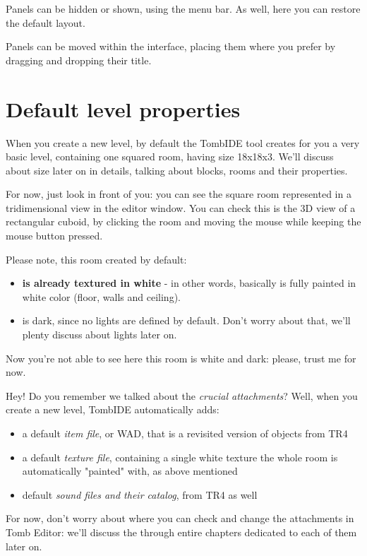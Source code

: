 Panels can be hidden or shown, using the  menu bar. As well, here you can restore the default layout.
\par Panels can be moved within the interface, placing them where you prefer by dragging and dropping their title.

\section{Default level properties}
When you create a new level, by default the TombIDE tool creates for you a very basic level, containing one squared room, having size 18x18x3.
We'll discuss about size later on in details, talking about blocks, rooms and their properties.
\par For now, just look in front of you: you can see the square room represented in a tridimensional view in the editor window. You can check this is the 3D view of a rectangular cuboid, by  clicking the room and moving the mouse while keeping the mouse button pressed.
\par Please note, this room created by default:
\begin{itemize}
    \item \textbf{is already textured in white} - in other words, basically is fully painted in white color (floor, walls and ceiling).
    \item is dark, since no lights are defined by default. Don't worry about that, we'll plenty discuss about lights later on.
\end{itemize}
Now you're not able to see here this room is white and dark: please, trust me for now.
\par Hey! Do you remember we talked about the \emph{crucial attachments}? Well, when you create a new level, TombIDE automatically adds:
\begin{itemize}
    \item a default \emph{item file}, or WAD, that is a revisited version of objects from TR4
    \item a default \emph{texture file}, containing a single white texture the whole room is automatically "painted" with, as above mentioned
    \item default \emph{sound files and their catalog}, from TR4 as well
\end{itemize}
For now, don't worry about where you can check and change the attachments in Tomb Editor: we'll discuss the through entire chapters dedicated to each of them later on.

